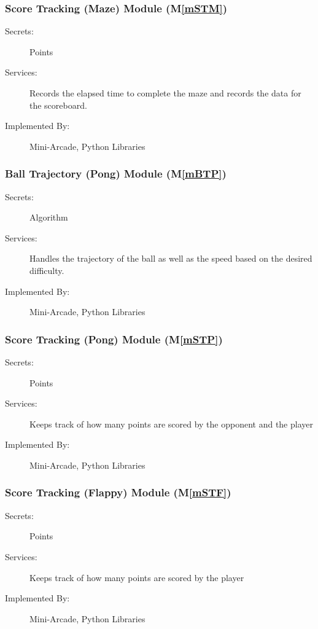 \documentclass[12pt, titlepage]{article}
\newcommand{\mref}[1]{M\ref{#1}}
\begin{document}
\subsubsection{Score Tracking (Maze) Module (\mref{mSTM})}
\begin{description}
\item[Secrets:] Points
\item[Services:] Records the elapsed time to complete the maze and records the data for the scoreboard.
\item[Implemented By:] Mini-Arcade, Python Libraries
\end{description}

\subsubsection{Ball Trajectory (Pong) Module (\mref{mBTP})}
\begin{description}
\item[Secrets:] Algorithm
\item[Services:] Handles the trajectory of the ball as well as the speed based on the desired difficulty.
\item[Implemented By:] Mini-Arcade, Python Libraries
\end{description}

\subsubsection{Score Tracking (Pong) Module (\mref{mSTP})}
\begin{description}
\item[Secrets:] Points
\item[Services:] Keeps track of how many points are scored by the opponent and the player 
\item[Implemented By:] Mini-Arcade, Python Libraries
\end{description}

\subsubsection{Score Tracking (Flappy) Module (\mref{mSTF})}
\begin{description}
\item[Secrets:] Points
\item[Services:] Keeps track of how many points are scored by the player 
\item[Implemented By:] Mini-Arcade, Python Libraries
\end{description}
\end{document}
